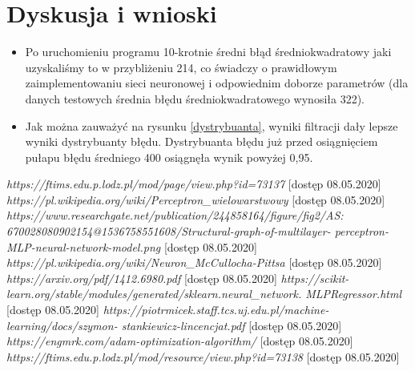 \documentclass{classrep}
\begin{document}
\section{Dyskusja i wnioski}
\begin{itemize}
	\item Po uruchomieniu programu 10-krotnie średni błąd średniokwadratowy jaki uzyskaliśmy to w przybliżeniu 214, co świadczy o prawidłowym zaimplementowaniu sieci neuronowej i odpowiednim doborze parametrów (dla danych testowych średnia błędu średniokwadratowego wynosiła 322).
	\item Jak można zauważyć na rysunku \ref{dystrybuanta}, wyniki filtracji dały lepsze wyniki dystrybuanty błędu. Dystrybuanta błędu już przed osiągnięciem pułapu błędu średniego 400 osiągnęła wynik powyżej 0,95.
\end{itemize}

\begin{thebibliography}{0}
  	 \textsl{https://ftims.edu.p.lodz.pl/mod/page/view.php?id=73137} [dostęp 08.05.2020]
	 \textsl{https://pl.wikipedia.org/wiki/Perceptron\_wielowarstwowy} [dostęp 08.05.2020]
	 \textsl{https://www.researchgate.net/publication/244858164/figure/fig2/AS:
		670028080902154@1536758551608/Structural-graph-of-multilayer-
		perceptron-MLP-neural-network-model.png} [dostęp 08.05.2020]
	 \textsl{https://pl.wikipedia.org/wiki/Neuron\_McCullocha-Pittsa} [dostęp 08.05.2020]
	 \textsl{https://arxiv.org/pdf/1412.6980.pdf} [dostęp 08.05.2020]
	 \textsl{https://scikit-learn.org/stable/modules/generated/sklearn.neural\_network.
		MLPRegressor.html} [dostęp 08.05.2020]
	 \textsl{https://piotrmicek.staff.tcs.uj.edu.pl/machine-learning/docs/szymon-
		stankiewicz-lincencjat.pdf} [dostęp 08.05.2020]
	 \textsl{https://engmrk.com/adam-optimization-algorithm/} [dostęp 08.05.2020]
	 \textsl{https://ftims.edu.p.lodz.pl/mod/resource/view.php?id=73138} [dostęp 08.05.2020]
\end{thebibliography}
\end{document}
